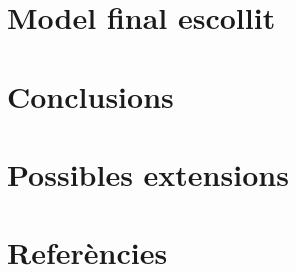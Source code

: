 \documentclass[a4paper]{article}
\begin{document}
\section{Model final escollit}
\section{Conclusions}
\section{Possibles extensions}
\section{Referències}



\end{document}

